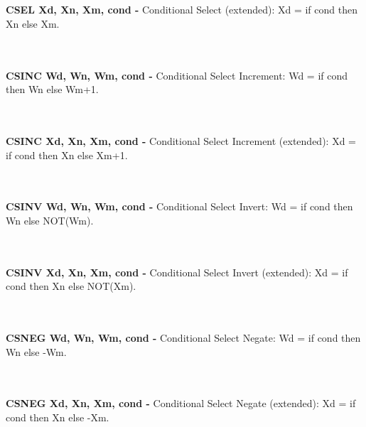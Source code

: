 \documentclass[12pt,a4paper,utf8]{ppgsi}
\begin{document}
\\\\\textbf{CSEL Xd, Xn, Xm, cond -} Conditional Select (extended): Xd = if cond then Xn else Xm. 

\\\\\textbf{CSINC Wd, Wn, Wm, cond -} Conditional Select Increment: Wd = if cond then Wn else Wm+1. 

\\\\\textbf{CSINC Xd, Xn, Xm, cond -} Conditional Select Increment (extended): Xd = if cond then Xn else Xm+1. 

\\\\\textbf{CSINV Wd, Wn, Wm, cond -} Conditional Select Invert: Wd = if cond then Wn else NOT(Wm). 

\\\\\textbf{CSINV Xd, Xn, Xm, cond -} Conditional Select Invert (extended): Xd = if cond then Xn else NOT(Xm). 

\\\\\textbf{CSNEG Wd, Wn, Wm, cond -} Conditional Select Negate: Wd = if cond then Wn else -Wm. 

\\\\\textbf{CSNEG Xd, Xn, Xm, cond -} Conditional Select Negate (extended): Xd = if cond then Xn else -Xm. 
\end{document}
